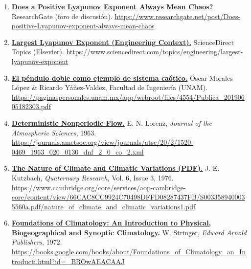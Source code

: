 \documentclass[
  10pt,
  a4paper,
  DIV=11,
  numbers=noendperiod,
  open=any]{scrreprt}
\numberwithin{equation}{chapter}
\numberwithin{equation}{section}
\renewcommand{\[}{\begin{equation}}
\renewcommand{\]}{\end{equation}}
\begin{document}
\begin{enumerate}
  \item \label{ref:web34}\href{https://www.researchgate.net/post/Does-positive-Lyapunov-exponent-always-mean-chaos}{\textbf{Does a Positive Lyapunov Exponent Always Mean Chaos?}} ResearchGate (foro de discusión).  
\url{https://www.researchgate.net/post/Does-positive-Lyapunov-exponent-always-mean-chaos}

\item \label{ref:web35}\href{https://www.sciencedirect.com/topics/engineering/largest-lyapunov-exponent}{\textbf{Largest Lyapunov Exponent (Engineering Context).}} ScienceDirect Topics (Elsevier).  
\url{https://www.sciencedirect.com/topics/engineering/largest-lyapunov-exponent}

\item \label{ref:web36}\href{https://paginaspersonales.unam.mx/app/webroot/files/4554/Publica_20190605182303.pdf}{\textbf{El péndulo doble como ejemplo de sistema caótico.}} Óscar Morales López & Ricardo Yáñez-Valdez, Facultad de Ingeniería (UNAM).  
\url{https://paginaspersonales.unam.mx/app/webroot/files/4554/Publica_20190605182303.pdf}

\item \label{ref:web37}\href{https://journals.ametsoc.org/view/journals/atsc/20/2/1520-0469_1963_020_0130_dnf_2_0_co_2.xml}{\textbf{Deterministic Nonperiodic Flow.}} E. N. Lorenz, \textit{Journal of the Atmospheric Sciences}, 1963.  
\url{https://journals.ametsoc.org/view/journals/atsc/20/2/1520-0469_1963_020_0130_dnf_2_0_co_2.xml}



\item \label{ref:web40}\href{https://www.cambridge.org/core/services/aop-cambridge-core/content/view/66CAC8CC9924C70498DFFD08287437FB/S0033589400035560a.pdf/nature_of_climate_and_climatic_variations1.pdf}{\textbf{The Nature of Climate and Climatic Variations (PDF).}} J. E. Kutzbach, \textit{Quaternary Research}, Vol. 6, Issue 3, 1976.  
\url{https://www.cambridge.org/core/services/aop-cambridge-core/content/view/66CAC8CC9924C70498DFFD08287437FB/S0033589400035560a.pdf/nature_of_climate_and_climatic_variations1.pdf}

\item \label{ref:web41}\href{https://books.google.com/books/about/Foundations_of_Climatology_an_Introducti.html?id=_BROwAEACAAJ}{\textbf{Foundations of Climatology: An Introduction to Physical, Biogeographical and Synoptic Climatology.}} W. Stringer, \textit{Edward Arnold Publishers}, 1972.  
\url{https://books.google.com/books/about/Foundations_of_Climatology_an_Introducti.html?id=_BROwAEACAAJ}


\end{enumerate}
\end{document}
